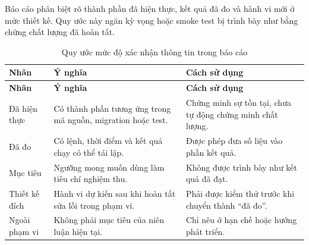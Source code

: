 \setcounter{table}{0}


Báo cáo phân biệt rõ thành phần đã hiện thực, kết quả đã đo và hành vi mới ở
mức thiết kế. Quy ước này ngăn kỳ vọng hoặc smoke test bị trình bày như bằng
chứng chất lượng đã hoàn tất.

\begin{longtable}{@{}L{3.0cm}L{5.2cm}L{5.8cm}@{}}
  \caption{Quy ước mức độ xác nhận thông tin trong báo cáo}\label{tab:report-status}\\
  \toprule
  \textbf{Nhãn} & \textbf{Ý nghĩa} & \textbf{Cách sử dụng} \\
  \midrule
  \endfirsthead
  \toprule
  \textbf{Nhãn} & \textbf{Ý nghĩa} & \textbf{Cách sử dụng} \\
  \midrule
  \endhead
  Đã hiện thực & Có thành phần tương ứng trong mã nguồn, migration hoặc test. & Chứng minh sự tồn tại, chưa tự động chứng minh chất lượng. \\
  Đã đo & Có lệnh, thời điểm và kết quả chạy có thể tái lập. & Được phép đưa số liệu vào phần kết quả. \\
  Mục tiêu & Ngưỡng mong muốn dùng làm tiêu chí nghiệm thu. & Không được trình bày như kết quả đã đạt. \\
  Thiết kế đích & Hành vi dự kiến sau khi hoàn tất sửa lỗi trong phạm vi. & Phải được kiểm thử trước khi chuyển thành ``đã đo''. \\
  Ngoài phạm vi & Không phải mục tiêu của niên luận hiện tại. & Chỉ nêu ở hạn chế hoặc hướng phát triển. \\
  \bottomrule
\end{longtable}
